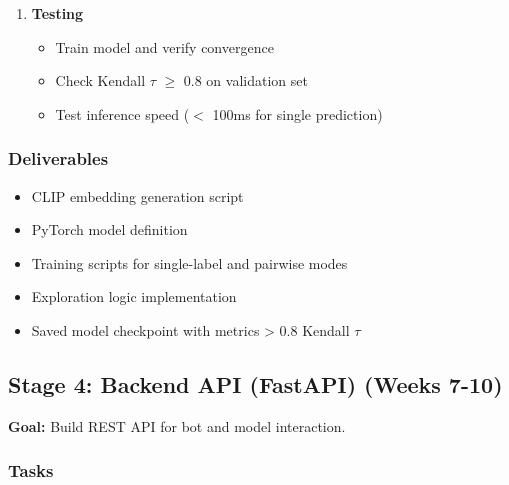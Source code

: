 \documentclass[12pt,a4paper]{article}
\begin{document}
\begin{enumerate}
    \item \textbf{Testing}
    \begin{itemize}
        \item Train model and verify convergence
        \item Check Kendall $\tau$ $\geq$ 0.8 on validation set
        \item Test inference speed ($<$ 100ms for single prediction)
    \end{itemize}
\end{enumerate}

\subsubsection{Deliverables}
\begin{itemize}
    \item CLIP embedding generation script
    \item PyTorch model definition
    \item Training scripts for single-label and pairwise modes
    \item Exploration logic implementation
    \item Saved model checkpoint with metrics > 0.8 Kendall $\tau$
\end{itemize}

\subsection{Stage 4: Backend API (FastAPI) (Weeks 7-10)}

\textbf{Goal:} Build REST API for bot and model interaction.

\subsubsection{Tasks}
\end{document}
